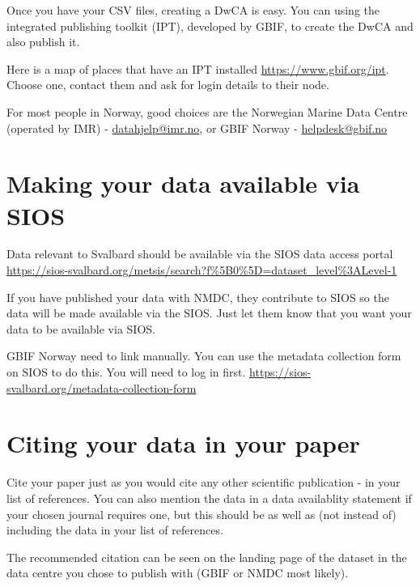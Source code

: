 \documentclass[a4paper,english, 11pt]{article}
\begin{document}
Once you have your CSV files, creating a DwCA is easy. You can using the integrated publishing toolkit (IPT), developed by GBIF, to create the DwCA and also publish it.

Here is a map of places that have an IPT installed \url{https://www.gbif.org/ipt}. Choose one, contact them and ask for login details to their node.

For most people in Norway, good choices are the Norwegian Marine Data Centre (operated by IMR) - \href{mailto:datahjelp@imr.no }{datahjelp@imr.no}, or GBIF Norway - \href{mailto:helpdesk@gbif.no}{helpdesk@gbif.no}

\section{Making your data available via SIOS}
\label{s:sios}

Data relevant to Svalbard should be available via the SIOS data access portal \url{https://sios-svalbard.org/metsis/search?f%5B0%5D=dataset_level%3ALevel-1}

If you have published your data with NMDC, they contribute to SIOS so the data will be made available via the SIOS. Just let them know that you want your data to be available via SIOS.

GBIF Norway need to link manually. You can use the metadata collection form on SIOS to do this. You will need to log in first. \url{https://sios-svalbard.org/metadata-collection-form}

\section{Citing your data in your paper}
\label{s:citing}

Cite your paper just as you would cite any other scientific publication - in your list of references. You can also mention the data in a data availablity statement if your chosen journal requires one, but this should be as well as (not instead of) including the data in your list of references.

The recommended citation can be seen on the landing page of the dataset in the data centre you chose to publish with (GBIF or NMDC most likely).
\end{document}

